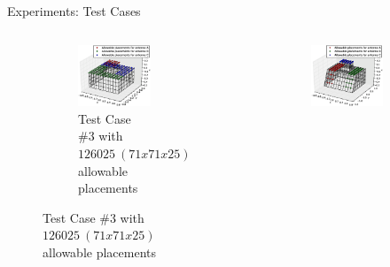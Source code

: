 \documentclass{beamer}
\begin{document}
\begin{frame}{Experiments: Test Cases}
\begin{columns}
\begin{column}{.5\columnwidth}
\begin{figure}
                \begin{subfigure}{\columnwidth}
                    \includegraphics[trim=0 30 0 50, clip, scale=0.25]{../paper/FIG/tc3_figure}%
                    \caption*{\tiny Test Case \#3 with $126025~(71x71x25)$ allowable placements}%
                \end{subfigure}\hfill%
            \end{figure}
        \end{column}
        \begin{column}{.5\columnwidth}
            \begin{figure}
                \vspace{-0.5cm}
                \begin{subfigure}{\columnwidth}
                    \includegraphics[trim=0 30 0 50, clip, scale=0.25]{../paper/FIG/tc2_figure}%

\end{subfigure}
\end{figure}
\end{column}
\end{columns}
\end{frame}
\end{document}
